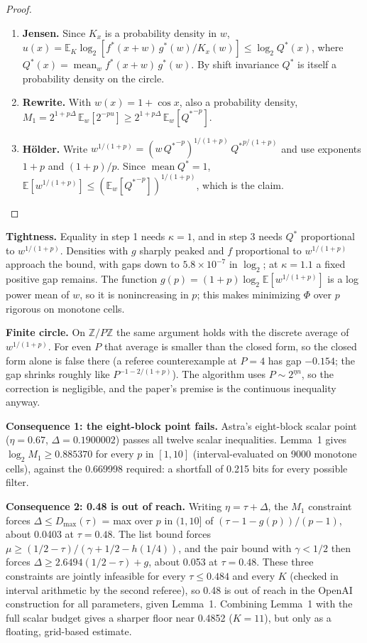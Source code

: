 \documentclass[11pt]{article}
\DeclareMathOperator{\mean}{mean}
\newcommand{\E}{\mathbb{E}}
\theoremstyle{plain}
\begin{document}
\begin{proof}
\leavevmode
\begin{enumerate}
\item \textbf{Jensen.} Since $K_x$ is a probability density in $w$, $u(x) = \E_K \log_2[f^*(x+w)\, g^*(w) / K_x(w)] \le \log_2 Q^*(x)$, where $Q^*(x) = \mean_w f^*(x+w)\, g^*(w)$. By shift invariance $Q^*$ is itself a probability density on the circle.
\item \textbf{Rewrite.} With $w(x) = 1 + \cos x$, also a probability density, $M_1 = 2^{1+p \Delta}\, \E_w[2^{-p u}] \ge 2^{1+p \Delta}\, \E_w[{Q^*}^{-p}]$.
\item \textbf{H\"older.} Write $w^{1/(1+p)} = (w\, {Q^*}^{-p})^{1/(1+p)}\, {Q^*}^{p/(1+p)}$ and use exponents $1+p$ and $(1+p)/p$. Since $\mean Q^* = 1$, $\E[w^{1/(1+p)}] \le (\E_w[{Q^*}^{-p}])^{1/(1+p)}$, which is the claim. \qedhere
\end{enumerate}
\end{proof}

\textbf{Tightness.} Equality in step 1 needs $\kappa = 1$, and in step 3 needs $Q^*$ proportional to $w^{1/(1+p)}$. Densities with $g$ sharply peaked and $f$ proportional to $w^{1/(1+p)}$ approach the bound, with gaps down to $5.8\times10^{-7}$ in $\log_2$; at $\kappa = 1.1$ a fixed positive gap remains. The function $g(p) = (1+p) \log_2 \E[w^{1/(1+p)}]$ is a log power mean of $w$, so it is nonincreasing in $p$; this makes minimizing $\Phi$ over $p$ rigorous on monotone cells.

\textbf{Finite circle.} On $\mathbb{Z}/P\mathbb{Z}$ the same argument holds with the discrete average of $w^{1/(1+p)}$. For even $P$ that average is smaller than the closed form, so the closed form alone is false there (a referee counterexample at $P = 4$ has gap $-0.154$; the gap shrinks roughly like $P^{-1-2/(1+p)}$). The algorithm uses $P \sim 2^{\eta n}$, so the correction is negligible, and the paper's premise is the continuous inequality anyway.

\textbf{Consequence 1: the eight-block point fails.} Astra's eight-block scalar point ($\eta = 0.67$, $\Delta = 0.1900002$) passes all twelve scalar inequalities. Lemma~1 gives $\log_2 M_1 \ge 0.885370$ for every $p$ in $[1, 10]$ (interval-evaluated on 9000 monotone cells), against the 0.669998 required: a shortfall of 0.215 bits for every possible filter.

\textbf{Consequence 2: 0.48 is out of reach.} Writing $\eta = \tau + \Delta$, the $M_1$ constraint forces $\Delta \le D_{\max}(\tau)$ = max over $p$ in $(1, 10]$ of $(\tau - 1 - g(p))/(p - 1)$, about 0.0403 at $\tau = 0.48$. The list bound forces $\mu \ge (1/2 - \tau)/(\gamma + 1/2 - h(1/4))$, and the pair bound with $\gamma < 1/2$ then forces $\Delta \ge 2.6494(1/2 - \tau) + g$, about 0.053 at $\tau = 0.48$. These three constraints are jointly infeasible for every $\tau \le 0.484$ and every $K$ (checked in interval arithmetic by the second referee), so 0.48 is out of reach in the OpenAI construction for all parameters, given Lemma~1. Combining Lemma~1 with the full scalar budget gives a sharper floor near 0.4852 ($K = 11$), but only as a floating, grid-based estimate.
\end{document}
